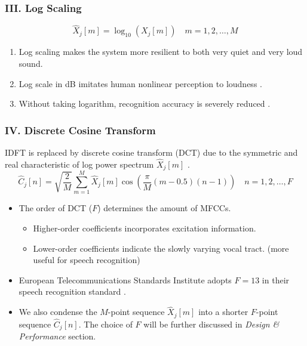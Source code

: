 
\begin{frame}
\frametitle{III. Log Scaling}
\begin{equation}
\hat{X}_j[m] = \log_{10}(X_j[m]) \quad m = 1, 2, \dots, M
\end{equation}

\begin{enumerate}
\item Log scaling makes the system more resilient to both very quiet and very loud sound.
\item Log scale in dB imitates human nonlinear perception to loudness \cite{farin2008mathematical}.
\item Without taking logarithm, recognition accuracy is severely reduced \cite{tan2008automatic}.
\end{enumerate}
\end{frame}


\begin{frame}
\frametitle{IV. Discrete Cosine Transform}
IDFT is replaced by discrete cosine transform (DCT) due to the symmetric and real characteristic of log power spectrum $\hat{X}_j[m]$ \cite{picone1993signal, iser2008bandwidth}.
\begin{equation}
\hat{C}_j[n] = \sqrt{\frac{2}{M}} \sum^{M}_{m=1} \hat{X}_j[m] \cos \left( \frac{\pi}{M} (m - 0.5) (n-1) \right) \quad n = 1, 2, \dots, F
\end{equation}

\begin{itemize}
	\item The order of DCT ($F$) determines the amount of MFCCs. \cite{tan2008automatic}
	\begin{itemize}
		\item Higher-order coefficients incorporates excitation information.
		\item Lower-order coefficients indicate the slowly varying vocal tract. (more useful for speech recognition)
	\end{itemize}
	\item European Telecommunications Standards Institute adopts $F = 13$ in their speech recognition standard \cite{etsi2001202}.
	\item We also condense the $M$-point sequence $\hat{X}_j[m]$ into a shorter $F$-point sequence $\hat{C}_j[n]$. The choice of $F$ will be further discussed in \textit{Design \& Performance} section.
\end{itemize}
\end{frame}
